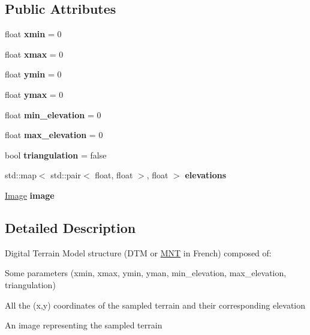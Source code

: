 \subsection*{Public Attributes}
\begin{DoxyCompactItemize}
\item 
\mbox{\label{structMNT_a8626ef7ebc59484acd44ae4a3fab6fde}} 
float {\bfseries xmin} = 0
\item 
\mbox{\label{structMNT_aa1335893335ca42e17ce1859b8bb620f}} 
float {\bfseries xmax} = 0
\item 
\mbox{\label{structMNT_ae6b46ea3a14d8ece99baf7b342165074}} 
float {\bfseries ymin} = 0
\item 
\mbox{\label{structMNT_a319e2c8bc5dbc576c5fc1450526aa459}} 
float {\bfseries ymax} = 0
\item 
\mbox{\label{structMNT_a313da80d0a8fd24ba56ba51e070c29b2}} 
float {\bfseries min\+\_\+elevation} = 0
\item 
\mbox{\label{structMNT_a0fa2bb2fc8258a96212568496d860bf1}} 
float {\bfseries max\+\_\+elevation} = 0
\item 
\mbox{\label{structMNT_ab5ae1542f4759c4b6514b852dfda969a}} 
bool {\bfseries triangulation} = false
\item 
\mbox{\label{structMNT_aad42a6c005fe6a63f7792cca148f898d}} 
std\+::map$<$ std\+::pair$<$ float, float $>$, float $>$ {\bfseries elevations}
\item 
\mbox{\label{structMNT_a37602fb86c7aeb6b974a385d7c20bf48}} 
\hyperlink{classImage}{Image} {\bfseries image}
\end{DoxyCompactItemize}


\subsection{Detailed Description}
Digital Terrain Model structure (D\+TM or \hyperlink{structMNT}{M\+NT} in French) composed of\+: 


\begin{DoxyItemize}
\item Some parameters (xmin, xmax, ymin, yman, min\+\_\+elevation, max\+\_\+elevation, triangulation)
\item All the (x,y) coordinates of the sampled terrain and their corresponding elevation
\item An image representing the sampled terrain
\end{DoxyItemize}

